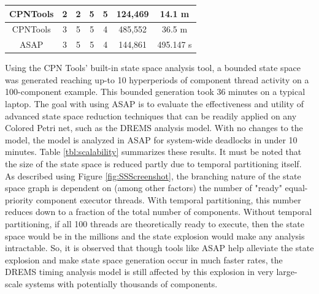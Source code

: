 \begin{table}[h]
\begin{tabular}{|c|c|c|c|c|c|c|}
		CPNTools      & 2                                                            & \textbf{2}                                                                     & 5                                                                                     & 5                                                                           & 124,469                                                                   & 14.1 m                                                              \\ \hline
		CPNTools      & 3                                                            & 5                                                                              & 5                                                                                     & 4                                                                           & 485,552                                                                   & 36.5 m                                                              \\ \hline
		ASAP          & 3                                                            & 5                                                                              & 5                                                                                     & 4                                                                           & 144,861                                                                   & 495.147 s                                                           \\ \hline
	\end{tabular}
\end{table}

Using the CPN Tools' built-in state space analysis tool, a bounded state space was generated reaching up-to 10 hyperperiods of component thread activity on a 100-component example. This bounded generation took 36 minutes on a typical laptop. The goal with using ASAP is to evaluate the effectiveness and utility of advanced state space reduction techniques that can be readily applied on any Colored Petri net, such as the DREMS analysis model. With no changes to the model, the model is analyzed in ASAP for system-wide deadlocks in under 10 minutes. Table \ref{tbl:scalability} summarizes these results. It must be noted that the size of the state space is reduced partly due to temporal partitioning itself. As described using Figure \ref{fig:SSScreenshot}, the branching nature of the state space graph is dependent on (among other factors) the number of "ready" equal-priority component executor threads. With temporal partitioning, this number reduces down to a fraction of the total number of components. Without temporal partitioning, if all 100 threads are theoretically ready to execute, then the state space would be in the millions and the state explosion would make any analysis intractable. So, it is observed that though tools like ASAP help alleviate the state explosion and make state space generation occur in much faster rates, the DREMS timing analysis model is still affected by this explosion in very large-scale systems with potentially thousands of components.


